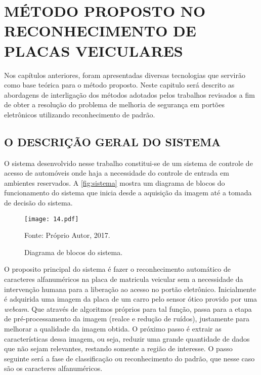 \chapter{\textbf{\uppercase{Método Proposto no Reconhecimento de Placas Veiculares}}}\label{cap_4}

Nos capítulos anteriores, foram apresentadas diversas tecnologias que servirão como base teórica para o método proposto. Neste capitulo será descrito as abordagens de interligação dos métodos adotados pelos trabalhos revisados a fim de obter a resolução do problema de melhoria de segurança em portões eletrônicos utilizando reconhecimento de padrão.

\section{\uppercase{O Descrição Geral do Sistema}}

O sistema desenvolvido nesse trabalho constitui-se de um sistema de controle de acesso de automóveis onde haja a necessidade do controle de entrada em ambientes reservados. A \autoref{fig:sistema} mostra um diagrama de blocos do funcionamento do sistema que inicia desde a aquisição da imagem até a tomada de decisão do sistema. 

\begin{figure}[htb]
	\centering
	\caption{{\footnotesize Diagrama de blocos do sistema.}}   %
	\label{fig:sistema}
	\texttt{[image: 14.pdf]}
	
	{\footnotesize Fonte: Próprio Autor, 2017.}
\end{figure}

O proposito principal do sistema é fazer o reconhecimento automático de caracteres alfanuméricos na placa de matricula veicular sem a necessidade da intervenção humana para a liberação ao acesso no portão eletrônico. Inicialmente é adquirida uma imagem da placa de um carro pelo sensor ótico provido por uma \emph{webcam}. Que através de algoritmos próprios para tal função, passa para a etapa de pré-processamento da imagem (realce e redução de ruídos), justamente para melhorar a qualidade da imagem obtida. O próximo passo é extrair as características dessa imagem, ou seja, reduzir uma grande quantidade de dados que não sejam relevantes, restando somente a região de interesse. O passo seguinte será a fase de classificação ou reconhecimento do padrão, que nesse caso são os caracteres alfanuméricos.

